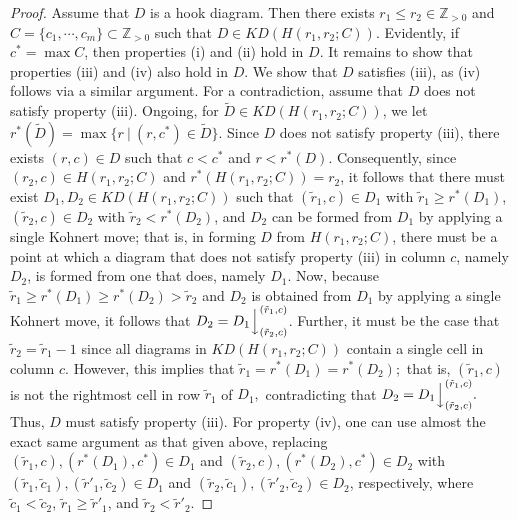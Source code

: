 \documentclass[letterpaper,10pt]{article}
\newcommand{\bl}[1]{{\color{blue} #1}}
\newcommand{\ldownarrow}{\Big\downarrow}
\begin{document}
\begin{proof}
    Assume that $D$ is a hook diagram. Then there exists $r_1\le r_2\in\mathbb{Z}_{>0}$ and $C=\{c_1,\cdots,c_m\}\subset \mathbb{Z}_{>0}$ such that $D\in KD(H(r_1,r_2;C))$. Evidently, if $c^*=\max C$, then properties (i) and (ii) hold in $D$. It remains to show that properties (iii) and (iv) also hold in $D$. We show that $D$ satisfies (iii), as (iv) follows via a similar argument. For a contradiction, assume that $D$ does not satisfy property (iii). Ongoing, for $\tilde{D}\in KD(H(r_1,r_2;C))$, we let $r^*(\tilde{D})=\max\{r~|~(r,c^*)\in \tilde{D}\}$. Since $D$ does not satisfy property (iii), there exists $(r,c)\in D$ such that $c<c^*$ and $r<r^*(D)$. Consequently, since $(r_2,c)\in H(r_1,r_2;C)$ and $r^*(H(r_1,r_2;C))=r_2$, it follows that there must exist $D_1,D_2\in KD(H(r_1,r_2;C))$ such that $(\tilde{r}_1,c)\in D_1$ with $\tilde{r}_1\ge r^*(D_1)$, $(\tilde{r}_2,c)\in D_2$ with $\tilde{r}_2<r^*(D_2)$, and $D_2$ can be formed from $D_1$ by applying a single Kohnert move; that is, in forming $D$ from $H(r_1,r_2;C)$, there must be a point at which a diagram that does not satisfy property (iii) in column $c$, namely $D_2$, is formed from one that does, namely $D_1$. Now, because $\tilde{r}_1\geq r^*(D_1)\geq r^*(D_2)>\tilde{r}_2$ and $D_2$ is obtained from $D_1$ by applying a single Kohnert move, it follows that $D_2=D_1\ldownarrow^{(\tilde{r}_1,c)}_{(\tilde{r}_2,c)}$. Further, it must be the case that $\tilde{r}_2=\tilde{r}_1-1$ since all diagrams in $KD(H(r_1,r_2;C))$ contain a single cell in column $c.$ However, this implies that $\tilde{r}_1=r^*(D_1)=r^*(D_2);$ that is, $(\tilde{r}_1,c)$ is not the rightmost cell in row $\tilde{r}_1$ of $D_1,$ contradicting that $D_2=D_1\ldownarrow^{(\tilde{r}_1,c)}_{(\tilde{r}_2,c)}.$
    Thus, $D$ must satisfy property (iii). For property (iv), one can use almost the exact same argument as that given above, replacing $(\tilde{r}_1,c),(r^*(D_1),c^*)\in D_1$ and $(\tilde{r}_2,c),(r^*(D_2),c^*)\in D_2$ with $(\tilde{r}_1,\tilde{c}_1),(\tilde{r}'_1,\tilde{c}_2)\in D_1$ and $(\tilde{r}_2,\tilde{c}_1),(\tilde{r}'_2,\tilde{c}_2)\in D_2$, respectively, where $\tilde{c}_1<\tilde{c}_2$, $\tilde{r}_1\ge\tilde{r}'_1$, and $\tilde{r}_2<\tilde{r}'_2$.


\end{proof}
\end{document}

